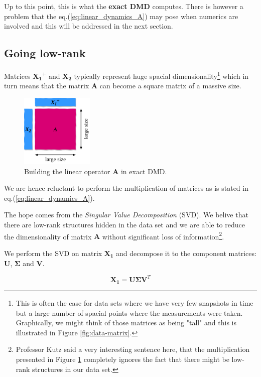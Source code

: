 \documentclass[10pt,twocolumn]{article}
\begin{document}
Up to this point, this is what the \textbf{exact DMD} computes. There is however a problem that the eq.(\ref{eq:linear_dynamics_A}) may pose when numerics are involved and this will be addressed in the next section. 

\subsection{Going low-rank}

Matrices $\bm{X_1}^{+}$ and $\bm{X_2}$ typically represent huge spacial dimensionality\footnote{This is often the case for data sets where we have very few snapshots in time but a large number of spacial points where the measurements were taken. Graphically, we might think of those matrices as being "tall" and this is illustrated in Figure \ref{fig:data-matrix}.} which in turn means that the matrix $\bm{A}$ can become a square matrix of a massive size. 

\begin{figure}
\centering\includegraphics[width=3.5cm]{getting-A.png}
\caption{Building the linear operator $\bm{A}$ in exact DMD.}
\label{fig:building-A}
\end{figure}

We are hence reluctant to perform the multiplication of matrices as is stated in eq.(\ref{eq:linear_dynamics_A}). 

The hope comes from the \textit{Singular Value Decomposition} (SVD). We belive that there are low-rank structures hidden in the data set and we are able to reduce the dimensionality of matrix $\bm{A}$ without significant loss of information\footnote{Professor Kutz said a very interesting sentence here, that the multiplication presented in Figure \ref{fig:building-A} completely ignores the fact that there might be low-rank structures in our data set.}.

We perform the SVD on matrix $\bm{X_1}$ and decompose it to the component matrices: $\bm{U}$, $\bm{\Sigma}$ and $\bm{V}$.

\begin{equation} \label{eq:solution}
\bm{X_1} = \bm{U} \bm{\Sigma} \bm{V}^T 
\end{equation}
\end{document}
